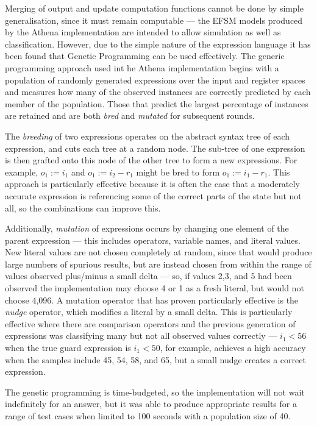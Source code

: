 Merging of output and update computation functions cannot be done by simple generalisation, since it must remain computable --- the EFSM models produced by the Athena implementation are intended to allow simulation as well as classification. However, due to the simple nature of the expression language it has been found that Genetic Programming \cite{} can be used effectively. The generic programming approach used int he Athena implementation begins with a population of randomly generated expressions over the input and register spaces and measures how many of the observed instances are correctly predicted by each member of the population. Those that predict the largest percentage of instances are retained and are both \emph{bred} and \emph{mutated} for subsequent rounds. 

The \emph{breeding} of two expressions operates on the abstract syntax tree of each expression, and cuts each tree at a random node. The sub-tree of one expression is then grafted onto this node of the other tree to form a new expressions. For example, $o_1 := i_1$ and $o_1 := i_2 - r_1$ might be bred to form $o_1 := i_1 - r_1$. This approach is particularly effective because it is often the case that a moderately accurate expression is referencing some of the correct parts of the state but not all, so the combinations can improve this.

Additionally, \emph{mutation} of expressions occurs by changing one element of the parent expression --- this includes operators, variable names, and literal values. New literal values are not chosen completely at random, since that would produce large numbers of spurious results, but are instead chosen from within the range of values observed plus/minus a small delta --- so, if values 2,3, and 5 had been observed the implementation may choose 4 or 1 as a fresh literal, but would not choose 4,096. A mutation operator that has proven particularly effective is the \emph{nudge} operator, which modifies a literal by a small delta. This is particularly effective where there are comparison operators and the previous generation of expressions was classifying many but not all observed values correctly --- $i_1 < 56$ when the true guard expression is $i_1 < 50$, for example, achieves a high accuracy when the samples include 45, 54, 58, and 65, but a small nudge creates a correct expression.

The genetic programming is time-budgeted, so the implementation will not wait indefinitely for an answer, but it was able to produce appropriate results for a range of test cases when limited to 100 seconds with a population size of 40.

